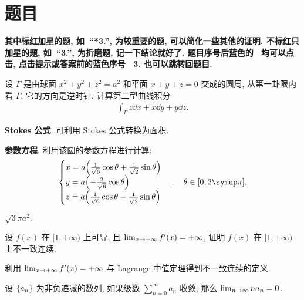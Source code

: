 \documentclass{ctexart}
\begin{document}
\section{题目}
{\bfseries 其中标红加星的题, 如\  ``{\bfseries\color{red}*3.}'',  为较重要的题, 可以简化一些其他的证明. 不标红只加星的题, 如\ ``{\bfseries*3.}'', 为折磨题, 记一下结论就好了. 题目序号后蓝色的\ {\color{blue}\mdseries [提示] [答案]} 均可以点击, 点击提示或答案前的蓝色序号\ {\color{blue} 3.} 也可以跳转回题目.}
\startexercise
\begin{exercise}[series=exer]
    \item 设 $ \Gamma $ 是由球面 $ x^{2} + y^{2} + z^{2} = a^{2} $ 和平面 $ x + y + z = 0 $ 交成的圆周, 从第一卦限内看 $ \Gamma $, 它的方向是逆时针. 计算第二型曲线积分 
    \begin{align*}
        \int_{\Gamma} z \dd{x} + x \dd{y} + y \dd{z}.
    \end{align*}
    \begin{hint}
        \begin{hintsheet}
            \item \textbf{Stokes 公式}. 可利用 Stokes 公式转换为面积.
            \item \textbf{参数方程}. 利用该圆的参数方程进行计算:
            \begin{align*}
                \begin{cases}
                    x = a\qty(\frac{1}{\sqrt{6}}\cos \theta + \frac{1}{\sqrt{2}}\sin \theta)\\
                    y = a\qty(-\frac{2}{\sqrt{6}}\cos \theta)\\
                    z = a\qty(\frac{1}{\sqrt{6}}\cos \theta - \frac{1}{\sqrt{2}}\sin \theta)
                \end{cases}, \quad \theta\in [0, 2\pi],
            \end{align*}
        \end{hintsheet}
    \end{hint}
    \begin{answer}
        $ \sqrt{3}\pi a^{2}. $ 
    \end{answer}
    \item 设 $ f(x) $ 在 $ [1, +\infty) $ 上可导, 且 $ \lim_{x \to +\infty}f'(x) = +\infty $, 证明 $ f(x) $ 在 $ [1, +\infty) $ 上不一致连续.
    \begin{hint}
        利用 $ \lim_{x \to +\infty}f'(x) = +\infty $ 与 Lagrange 中值定理得到不一致连续的定义.
    \end{hint}
    \item 设 $ \qty{a_{n}} $ 为非负递减的数列, 如果级数 $ \sum_{n=0}^{\infty}a_{n} $ 收敛, 那么 $ \lim_{n \to \infty} na_{n} = 0 $. 

\end{exercise}
\end{document}
